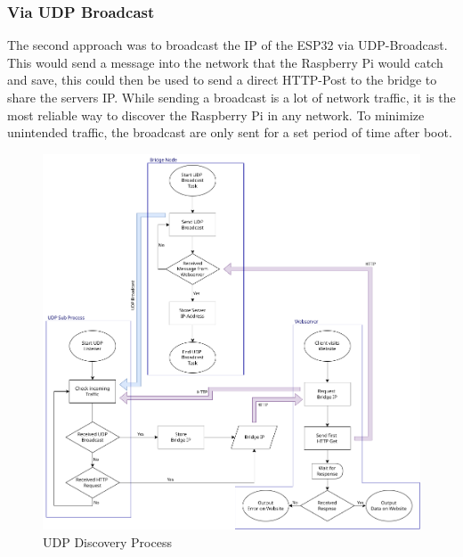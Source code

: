         \subsubsection{Via UDP Broadcast}
        The second approach was to broadcast the IP of the ESP32
        via UDP-Broadcast. This would send a 
        message into the network that the Raspberry Pi
        would catch and save, this could then be used to send a
        direct HTTP-Post to the bridge to share the servers IP. 
        While sending a broadcast is
        a lot of network traffic, it is the most reliable way
        to discover the Raspberry Pi in any network. To minimize
        unintended traffic, the broadcast are only sent for a set
        period of time after boot.
        \begin{figure}
            \centering
            \includegraphics[width=\textwidth]{topics/flowcharts/UDP-Discovery.drawio.png}
            \caption{UDP Discovery Process}
            \label{fig:udp_discovery}
        \end{figure}

